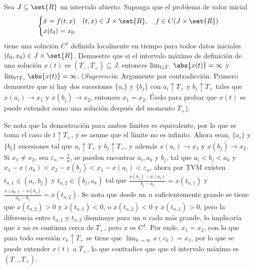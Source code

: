 \documentclass{homework}
\begin{document}
\begin{prob}
    Sea \(J\subseteq\set{R}\) un intervalo abierto. Suponga que el problema de valor inicial
    \[\begin{cases}
            \dot{x}=f(t,x) & (t,x)\in J\times\set{R},\quad f\in C(J\times\set{R}) \\
            x(t_0)=x_0
        \end{cases}\]
    tiene una solución \(C^1\) definida localmente en tiempo para todos datos iniciales \((t_0,x_0)\in J\times\set{R}\). Demuestre que si el intervalo máximo de definición de una solución \(x(t)\) es \((T_-,T_+)\subseteq J\), entonces \(\lim_{t\downarrow T_-}\abs{x(t)}=\infty\) y \(\lim_{t\uparrow T_+}\abs{x(t)}=\infty\). (\textit{Sugerencia}: Argumente por contradicción. Primero demuestre que si hay dos sucesiones \(\{a_i\}\) y \(\{b_j\}\) con \(a_i\uparrow T_+\) y \(b_j\uparrow T_+\) tales que \(x(a_i)\rightarrow x_1\) y \(x(b_j)\rightarrow x_2\), entonces \(x_1=x_2\). Úselo para probar que \(x(t)\) se puede extender como una solución después del momento \(T_+\)).
\end{prob}

\begin{sol}
    Se nota que la demostración para ambos límites es equivalente, por lo que se toma el caso de \(t\uparrow T_+\), y se asume que el límite no es infinito. Ahora sean, \(\{a_i\}\) y \(\{b_j\}\) sucesiones tal que \(a_i\uparrow T_+\) y \(b_j\uparrow T_+\), y además \(x(a_i)\rightarrow x_1\) y \(x(b_j)\rightarrow x_2\). Si \(x_1\neq x_2\), sea \(\varepsilon_n=\frac1n\), se pueden encontrar \(a_i,a_k\) y \(b_j\), tal que \(a_i<b_j<a_k\) y \(x_1-x(a_k)<x_2-x(b_j)<x_1-x(a_i)<\varepsilon_n\), ahora por TVM existen \(t_{n,1}\in(a_i,b_j)\) y \(t_{n,2}\in(b_j,a_k)\) tal que \(\frac{x(b_j)-x(a_i)}{b_j-a_i}=\dot{x}(t_{n,1})\) y \(\frac{x(a_k)-x(b_j)}{a_k-b_j}=\dot{x}(t_{n,2})\). Se nota que desde un \(n\) suficientemente grande se tiene que \(\dot{x}(t_{n,2})>0\) y \(\dot{x}(t_{n,1})<0\), o \(\dot{x}(t_{n,2})<0\) y \(\dot{x}(t_{n,1})>0\), pero la diferencia entre \(t_{n,1}\) y \(t_{n,2}\) disminuye para un \(n\) cada más grande, lo implicaría que \(\dot{x}\) no es continua cerca de \(T_+\), pero \(x\) es \(C^1\). Por ende, \(x_1=x_2\), con lo que para todo sucesión \(c_k\uparrow T_+\) se tiene que \(\lim_{k\rightarrow\infty}x(c_k)=x_1\), por lo que se puede extender \(x(t)\) a \(T_+\), lo que contradice que que el intervalo máximo es \((T_-,T_+)\).
\end{sol}
\end{document}
